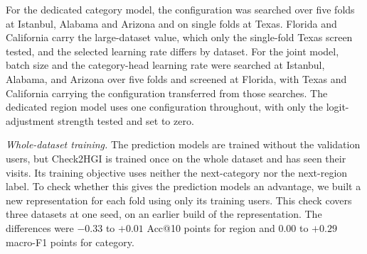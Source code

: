 For the dedicated category model, the configuration was searched over five folds at Istanbul, Alabama and Arizona and on single folds at Texas. Florida and California carry the large-dataset value, which only the single-fold Texas screen tested, and the selected learning rate differs by dataset. For the joint model, batch size and the category-head learning rate were searched at Istanbul, Alabama, and Arizona over five folds and screened at Florida, with Texas and California carrying the configuration transferred from those searches. The dedicated region model uses one configuration throughout, with only the logit-adjustment strength tested and set to zero.

\emph{Whole-dataset training.} The prediction models are trained without the validation users, but Check2HGI is trained once on the whole dataset and has seen their visits. Its training objective uses neither the next-category nor the next-region label. To check whether this gives the prediction models an advantage, we built a new representation for each fold using only its training users. This check covers three datasets at
one seed, on an earlier build of the representation.
The differences were $-0.33$ to $+0.01$ Acc@10 points for region and $0.00$ to
$+0.29$ macro-F1 points for category.

